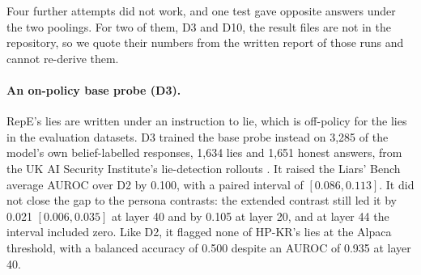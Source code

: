 Four further attempts did not work, and one test gave opposite answers under the two poolings.
For two of them, D3 and D10, the result files are not in the repository, so we quote their numbers from the written report of those runs and cannot re-derive them. %

\paragraph{An on-policy base probe (D3).}
RepE's lies are written under an instruction to lie, which is off-policy for the lies in the evaluation datasets. %
D3 trained the base probe instead on 3{,}285 of the model's own belief-labelled responses, 1{,}634 lies and 1{,}651 honest answers, from the UK AI Security Institute's lie-detection rollouts \parencite{aisi2026liedetection}. %
It raised the Liars' Bench average AUROC over D2 by 0.100, with a paired interval of $[0.086, 0.113]$. %
It did not close the gap to the persona contrasts: the extended contrast still led it by 0.021 $[0.006, 0.035]$ at layer 40 and by 0.105 at layer 20, and at layer 44 the interval included zero. %
Like D2, it flagged none of HP-KR's lies at the Alpaca threshold, with a balanced accuracy of 0.500 despite an AUROC of 0.935 at layer 40. %

